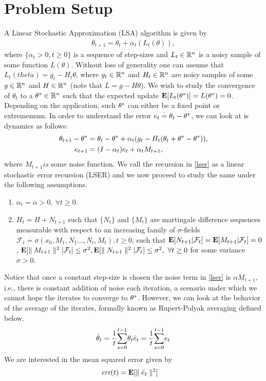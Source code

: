 \section{Problem Setup}
A Linear Stochastic Approximation (LSA) algorithm is given by
\begin{align}\label{lsa}
\theta_{t+1}=\theta_t+\alpha_t(L_t(\theta)),
\end{align}
where $\{\alpha_t>0,t\geq 0\}$ is a sequence of step-sizes and $L_t\in \mathbb{R}^n$ is a noisy sample of some function $L(\theta)$. Without loss of generality one can assume that $L_t(theta)=g_t-H_t\theta$, where $g_t\in\mathbb{R}^n$ and $H_t\in \mathbb{R}^n$ are noisy samples of some $g\in \mathbb{R}^n$ and $H\in \mathbb{R}^n$ (note that $L=g-H\theta$). We wish to study the convergence of $\theta_t$ to a $\theta^*\in\mathbb{R}^n$ such that the expected update $\mathbf{E}[L_t(\theta^*)]=L(\theta^*)=0$. Depending on the application, such $\theta^*$ can either be a fixed point or extrememum. In order to understand the error $e_t\stackrel{\cdot}{=}\theta_t-\theta^*$, we can look at is dynamics as follows:
\begin{align}\label{lser}
\theta_{t+1}-\theta^*&=\theta_t-\theta^*+\alpha_t(g_t- H_t (\theta_t+\theta^*-\theta^*)),\nonumber\\
e_{t+1}&=(I-\alpha_t)e_t+\alpha_t M_{t+1},
\end{align}
where $M_{t+1} is$ some noise function. We call the recursion in \eqref{lser} as a linear stochastic error recursion (LSER) and we now proceed to study the same under the following assumptions.
\begin{assumption}\label{fpassump}
\begin{enumerate}[leftmargin=*]
\item $\alpha_t=\alpha>0,~\forall t\geq 0$.
\item $H_t=H+N_{t+1}$ such that $\{N_t\}$ and $\{M_t\}$ are martingale difference sequences measurable with respect to an increasing family of $\sigma$-fields $\mathcal{F}_{t}\stackrel{\cdot}{=}\sigma(x_0,M_1,N_1\ldots,N_t,M_t),t\geq 0$, such that $\mathbf{E}[N_{t+1}|\mathcal{F}_t]=\mathbf{E}[M_{t+1}|\mathcal{F}_t]=0$, $\mathbf{E}[\parallel M_{t+1} \parallel^2|\mathcal{F}_t]\leq \sigma^2, \mathbf{E}[\parallel N_{t+1} \parallel^2|\mathcal{F}_t]\leq \sigma^2, ~\forall t\geq 0$ for some variance $\sigma>0$.
\end{enumerate}
\end{assumption}
Notice that once a constant step-size is chosen the noise term in \eqref{lser} is $\alpha M_{t+1}$, i.e., there is constant addition of noise each iteration, a scenario under which we cannot hope the iterates to converge to $\theta^*$. However, we can look at the behavior of the average of the iterates, formally known as Rupert-Polyak averaging defined below.
\begin{align}\label{erp}
\begin{split}
\bar{\theta}_{t}=\frac{1}{t}\overset{t-1}{\underset{s=0}{\sum}}\theta_t
\bar{e}_{t}=\frac{1}{t}\overset{t-1}{\underset{s=0}{\sum}}e_t
\end{split}
\end{align}
We are interested in the mean squared error given by
\begin{align}\label{errfun}
\emph{err}(t)&= \mathbf{E}[\parallel \bar{e}_t\parallel^2]
\end{align}
